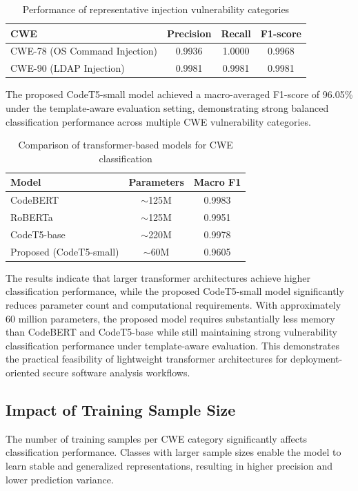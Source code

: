 \documentclass[conference]{IEEEtran}
\begin{document}
\begin{table}[t]
\centering
\caption{Performance of representative injection vulnerability categories}
\label{tab:injection}
\begin{tabular}{lccc}
\toprule
CWE & Precision & Recall & F1-score \\
\midrule
CWE-78 (OS Command Injection) & 0.9936 & 1.0000 & 0.9968 \\
CWE-90 (LDAP Injection) & 0.9981 & 0.9981 & 0.9981 \\
\bottomrule
\end{tabular}
\end{table}

The proposed CodeT5-small model achieved a macro-averaged F1-score of 96.05\% under the template-aware evaluation setting, demonstrating strong balanced classification performance across multiple CWE vulnerability categories.
\begin{table}[t]
\centering
\caption{Comparison of transformer-based models for CWE classification}
\begin{tabular}{lcc}
\toprule
Model & Parameters & Macro F1 \\
\midrule
CodeBERT & $\sim$125M & 0.9983 \\
RoBERTa & $\sim$125M & 0.9951 \\
CodeT5-base & $\sim$220M & 0.9978 \\
Proposed (CodeT5-small) & $\sim$60M & 0.9605 \\
\bottomrule
\end{tabular}
\label{tab:modelcomparison}
\end{table}

The results indicate that larger transformer architectures achieve higher classification performance, while the proposed CodeT5-small model significantly reduces parameter count and computational requirements. With approximately 60 million parameters, the proposed model requires substantially less memory than CodeBERT and CodeT5-base while still maintaining strong vulnerability classification performance under template-aware evaluation. This demonstrates the practical feasibility of lightweight transformer architectures for deployment-oriented secure software analysis workflows.

\subsection{Impact of Training Sample Size}

The number of training samples per CWE category significantly affects classification performance. Classes with larger sample sizes enable the model to learn stable and generalized representations, resulting in higher precision and lower prediction variance.
\end{document}
